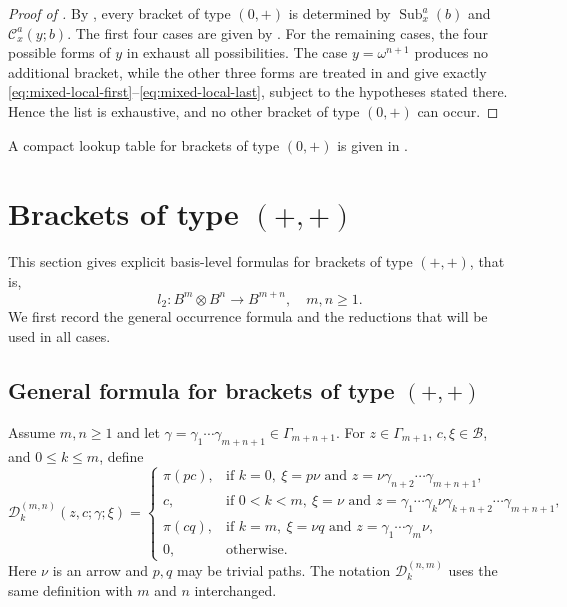 \documentclass[11pt,a4paper,reqno]{amsart}
\newcommand{\mB}{\mathcal B}
\newcommand{\mC}{\mathcal C}
\newcommand{\mD}{\mathcal D}
\newcommand{\Sub}{\operatorname{Sub}}
\theoremstyle{plain}
\theoremstyle{definition}
\numberwithin{equation}{section}
\begin{document}
	\begin{proof}[Proof of ]
		By , every bracket of type $(0,+)$ is determined by
		$\Sub_x^a(b)$ and $\mC_x^a(y;b)$.  The first four cases are given
		by
		.  For the remaining cases, the four possible forms
		of $y$ in  exhaust all possibilities.  The case
		$y=\omega^{n+1}$ produces no additional bracket, while the other three forms
		are treated in
		 and give exactly
		\eqref{eq:mixed-local-first}--\eqref{eq:mixed-local-last}, subject to the
		hypotheses stated there.  Hence the list is exhaustive, and no other bracket
		of type $(0,+)$ can occur.
	\end{proof}
	
	A compact lookup table for brackets of type $(0,+)$ is given in
	.
	\section{Brackets of type \texorpdfstring{$(+,+)$}{(+,+)}}\label{sec:positive-positive-classification}
	
	This section gives explicit basis-level formulas for brackets of type $(+,+)$,
	that is,
	\[
	l_2:B^m\otimes B^n\longrightarrow B^{m+n},\quad m,n\geq1.
	\]
	We first record the general occurrence formula and the reductions that will be
	used in all cases.
	
	\subsection{General formula for brackets of type \texorpdfstring{$(+,+)$}{(+,+)}}
	
	Assume $m,n\geq1$ and let
	$\gamma=\gamma_1\cdots\gamma_{m+n+1}\in\Gamma_{m+n+1}$.
	For $z\in\Gamma_{m+1}$, $c,\xi\in\mB$, and $0\leq k\leq m$, define
	\[
	\mD_k^{(m,n)}(z,c;\gamma;\xi)=
	\begin{cases}
		\pi(pc),
		&\text{if }k=0,\ \xi=p\nu
		\text{ and } z=\nu\gamma_{n+2}\cdots\gamma_{m+n+1},\\
		c,
		&\text{if } 0<k<m,\ \xi=\nu
		\text{ and } z=\gamma_1\cdots\gamma_k\nu\gamma_{k+n+2}\cdots\gamma_{m+n+1},\\
		\pi(cq),
		&\text{if }k=m,\ \xi=\nu q
		\text{ and }z=\gamma_1\cdots\gamma_m\nu,\\
		0,&\text{otherwise.}
	\end{cases}
	\]
	Here $\nu$ is an arrow and $p,q$ may be trivial paths.
	The notation $\mD_k^{(n,m)}$ uses the same definition with $m$ and $n$ interchanged.
	
\end{document}
